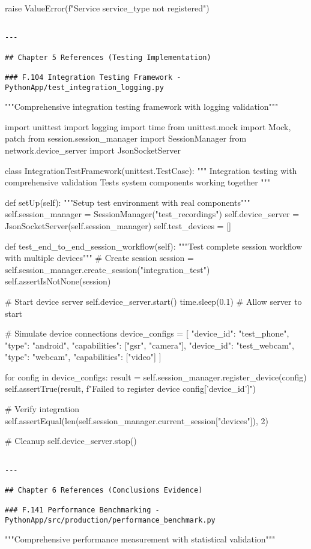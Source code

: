 \documentclass[12pt,a4paper]{report}
\begin{document}
        raise ValueError(f"Service {service\_type} not registered")
\begin{verbatim}

---

## Chapter 5 References (Testing Implementation)

### F.104 Integration Testing Framework - PythonApp/test_integration_logging.py

\end{verbatim}
"""Comprehensive integration testing framework with logging validation"""

import unittest
import logging
import time
from unittest.mock import Mock, patch
from session.session\_manager import SessionManager
from network.device\_server import JsonSocketServer


class IntegrationTestFramework(unittest.TestCase):
    """
    Integration testing with comprehensive validation
    Tests system components working together
    """

    def setUp(self):
        """Setup test environment with real components"""
        self.session\_manager = SessionManager("test\_recordings")
        self.device\_server = JsonSocketServer(self.session\_manager)
        self.test\_devices = []

    def test\_end\_to\_end\_session\_workflow(self):
        """Test complete session workflow with multiple devices"""
        \# Create session
        session = self.session\_manager.create\_session("integration\_test")
        self.assertIsNotNone(session)

        \# Start device server
        self.device\_server.start()
        time.sleep(0.1)  \# Allow server to start

        \# Simulate device connections
        device\_configs = [
            {"device\_id": "test\_phone", "type": "android", "capabilities": ["gsr", "camera"]},
            {"device\_id": "test\_webcam", "type": "webcam", "capabilities": ["video"]}
        ]

        for config in device\_configs:
            result = self.session\_manager.register\_device(config)
            self.assertTrue(result, f"Failed to register device {config['device\_id']}")

        \# Verify integration
        self.assertEqual(len(self.session\_manager.current\_session["devices"]), 2)

        \# Cleanup
        self.device\_server.stop()
\begin{verbatim}

---

## Chapter 6 References (Conclusions Evidence)

### F.141 Performance Benchmarking - PythonApp/src/production/performance_benchmark.py

\end{verbatim}
"""Comprehensive performance measurement with statistical validation"""
\end{document}
